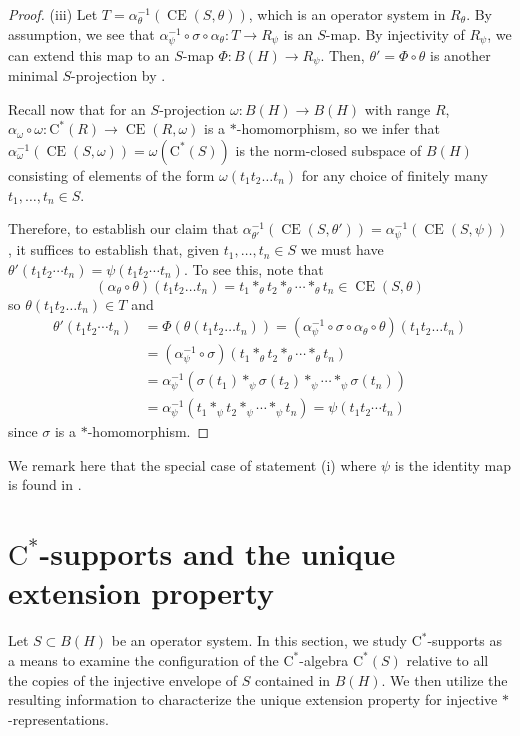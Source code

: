 \documentclass[10pt]{amsart}
\newcommand{\rC}{\mathrm{C}}
\newcommand{\CE}{\operatorname{CE}}
\theoremstyle{definition}
\begin{document}
\begin{proof}
(iii) Let $T=\alpha_\theta^{-1}(\CE(S,\theta))$, which is an operator system in $R_\theta$. By assumption, we see that $\alpha_\psi^{-1}\circ \sigma\circ \alpha_\theta:T\to R_\psi$ is an $S$-map. By injectivity of $R_\psi$, we can extend this map to an $S$-map  $\Phi:B(H)\to R_\psi$. Then, $\theta'=\Phi\circ \theta$ is another minimal $S$-projection by \cite[Proposition 2.11]{paulsen2011}. 

Recall  now that for an $S$-projection $\omega:B(H)\to B(H)$ with range $R$, $\alpha_\omega\circ \omega:\rC^*(R)\to \CE(R,\omega)$ is a $*$-homomorphism, so we infer that
$
\alpha_\omega^{-1}(\CE(S,\omega))=\omega(\rC^*(S))
$
 is the norm-closed subspace of $B(H)$ consisting of elements of the form $\omega(t_1 t_2\ldots t_n)$ for any choice of finitely many  $t_1,\ldots,t_n\in S$. 
 
 Therefore, to establish our claim that $\alpha_{\theta'}^{-1}(\CE(S,\theta'))=\alpha_\psi^{-1}(\CE(S,\psi))$, it suffices to establish that, given $t_1,\ldots,t_n\in S$ we must have $\theta'(t_1t_2\cdots t_n)=\psi(t_1t_2\cdots t_n)$. 
 To see this, note that \[(\alpha_\theta\circ \theta)(t_1t_2\ldots t_n)=t_1*_\theta t_2 *_\theta \cdots *_\theta t_n\in \CE(S,\theta)\]
so $\theta(t_1t_2\ldots t_n)\in T$ and
\begin{align*}
\theta'(t_1t_2\cdots t_n)&=\Phi( \theta(t_1t_2\ldots t_n))=(\alpha_\psi^{-1}\circ \sigma\circ \alpha_\theta \circ \theta)(t_1t_2\ldots t_n)\\
&=(\alpha_\psi^{-1}\circ \sigma)(t_1*_\theta t_2 *_\theta \cdots *_\theta t_n) \\
&=\alpha_\psi^{-1}(\sigma(t_1)*_\psi \sigma(t_2) *_\psi \cdots *_\psi \sigma(t_n))\\
&=\alpha_\psi^{-1}(t_1*_\psi t_2 *_\psi \cdots *_\psi t_n)=\psi(t_1t_2\cdots t_n)
\end{align*}
since $\sigma$ is a $*$-homomorphism. 
\end{proof}


We remark here that the special case of statement (i) where $\psi$ is the identity map is found in \cite[Corollary 3.1]{kakariadis2013}.



\section{$\rC^*$-supports and the unique  extension property}\label{S:Cstarext}



Let $S\subset B(H)$ be an operator system. In this section, we study $\rC^*$-supports as a means to examine the configuration of the $\rC^*$-algebra $\rC^*(S)$ relative to all the copies of the injective envelope of $S$ contained in $B(H)$. We then utilize the resulting information to characterize the unique extension property for injective $*$-representations.
\end{document}
